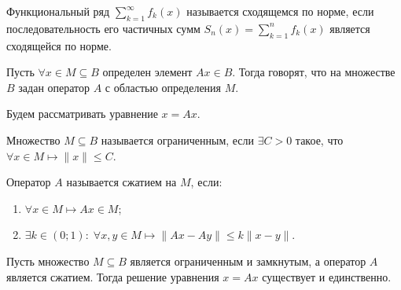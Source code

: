 \begin{definition}
	Функциональный ряд $\sum\limits_{k = 1}^{\infty} f_k(x)$ называется сходящемся по норме, если последовательность его частичных сумм $S_n(x) = \sum\limits_{k = 1}^{n} f_k(x)$ является сходящейся по норме.
\end{definition}

\begin{definition}
	Пусть $\forall x \in M \subseteq B$ определен элемент $Ax \in B$. Тогда говорят, что на множестве $B$ задан оператор $A$ с областью определения $M$.
\end{definition}

Будем рассматривать уравнение $x = Ax$.

\begin{definition}
	Множество $M \subseteq B$ называется ограниченным, если $\exists C > 0$ такое, что $\forall x \in M \longmapsto \|x\| \leqslant C$.
\end{definition}

\begin{definition}
	Оператор $A$ называется сжатием на $M$, если:
	\begin{enumerate}
		\item $\forall x \in M \longmapsto Ax \in M$;
		
		\item $\exists k \in (0; 1): \; \forall x, y \in M \longmapsto \|Ax - Ay\| \leqslant k\|x -y\|$.
	\end{enumerate}
\end{definition}

\begin{theorem}
	
	Пусть множество $M \subseteq B$ является ограниченным и замкнутым, а оператор $A$ является сжатием. Тогда решение уравнения $x = Ax$ существует и единственно.
\end{theorem}

